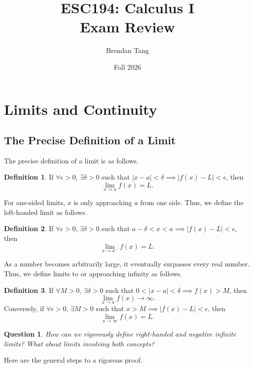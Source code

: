 \documentclass[11pt]{scrartcl}
\title{ESC194: Calculus I \\[0.1in] Exam Review}
\author{Brendan Tang}
\date{Fall 2026}
\theoremstyle{plain}
\newtheorem*{question}{Question}
\theoremstyle{definition}
\newtheorem*{definition}{Definition}
\theoremstyle{remark}
\begin{document}
\maketitle
\thispagestyle{empty}

\tableofcontents

\newpage
\section{Limits and Continuity}
\subsection{The Precise Definition of a Limit}

The precise definition of a limit is as follows.

\begin{definition}
    If $\forall\epsilon>0$, $\exists\delta>0$ such that $\lvert x-a \rvert<\delta\implies
    \lvert f(x)-L \rvert<\epsilon$, then \[ \lim_{x \to a}f(x)=L. \]
\end{definition}

For one-sided limits, $x$ is only approaching $a$ from one side. Thus, we define the left-handed
limit as follows.

\begin{definition}
    If $\forall\epsilon>0$, $\exists\delta>0$ such that $a-\delta<x<a\implies \lvert f(x)-L \rvert
    <\epsilon$, then \[ \lim_{ x \to a^- }f(x)=L. \]
\end{definition}

As a number becomes arbitrarily large, it eventually surpasses every real number. Thus, we define
limits to or approaching infinity as follows.

\begin{definition}
    If $\forall M>0$, $\exists\delta>0$ such that $0<\lvert x-a \rvert<\delta\implies f(x)>M$, then
    \[ \lim_{ x \to a }f(x) \to \infty. \]
    Conversely, if $\forall\epsilon>0$, $\exists M>0$ such that $x>M\implies \lvert f(x)-L \rvert
    <\epsilon$, then \[ \lim_{ x \to \infty }f(x)=L. \]
\end{definition}

\begin{question}
    How can we rigorously define right-handed and negative infinite limits? What about limits 
    involving both concepts?
\end{question}

Here are the general steps to a rigorous proof.
\end{document}
